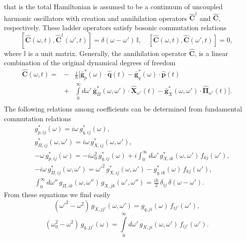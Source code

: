 \documentclass[preprint,showpacs,showkeys,groupedaddress,superscriptaddress]{revtex4}
\begin{document}
that is the total Hamiltonian is assumed to be a continuum of uncoupled harmonic oscillators with creation and annihilation operators $\hat{\mathbf{C}}^{\dag}$ and $\hat{\mathbf{C}}$, respectively. These ladder operators satisfy bosonic commutation relations
\begin{equation}\label{66}
\left[ \mathbf{\hat C}(\omega ,t),\mathbf{\hat C}^\dag (\omega',t) \right] = \delta (\omega-\omega')\,\mathbb{I},\,\,\,\,\,\,\left[ \mathbf{\hat C}(\omega ,t),\mathbf{\hat C}(\omega ',t)\right] = 0,
\end{equation}
where $\mathbb{I}$ is a unit matrix. Generally, the annihilation operator $\hat{\mathbf{C}}$, is a linear combination of the original dynamical degrees of freedom
\begin{eqnarray}
\hat{\mathbf{C}} (\omega,t) = &-& \frac{i}{\hbar }\bigg[\bar{\mathbf{g}}^{*}_p (\omega )\cdot\hat{\mathbf{q}}(t) -
\bar{\mathbf{g}}^{*}_q (\omega )\cdot\hat{\mathbf{p}}(t)\nonumber \\
&+& \int\limits_0^\infty d\omega'\,\bar{\mathbf{g}}^{*}_{\Pi} (\omega ,\omega')\cdot\hat{\mathbf{X}}_{\omega'} (t)-
\bar{\mathbf{g}}^{*}_X (\omega,\omega')\cdot\hat{\mathbf{\Pi}}_{\omega'} (t)\bigg]. \nonumber\\
\end{eqnarray}
The following relations among coefficients can be determined from fundamental commutation relations
\begin{eqnarray}
&& g^*_{p,ij} (\omega)=i \omega\,g^*_{q,ij} (\omega),\\
&& g^*_{\Pi,ij} (\omega,\omega')=i \omega\,g^*_{X,ij} (\omega,\omega'),\\
&& -\omega\, g^*_{p,ij} (\omega)=-i \omega_0^2\,g^*_{q,ij} (\omega)+i\int_0^\infty d\omega'\,g^*_{X,ik} (\omega,\omega')\,f_{kj} (\omega'),\\
&& -i\omega\, g^*_{\Pi,ij} (\omega,\omega')={\omega'}^2\,g^*_{X,ij} (\omega,\omega')-g^*_{q,ik} (\omega)\,f_{kj} (\omega'),\\
&& \int_0^\infty d \omega''\,g_{\Pi,ik} (\omega,\omega'')\,g_{X,jk} (\omega',\omega'')=\frac{i\hbar}{2}\,\delta_{ij}\,\delta(\omega-\omega').
\end{eqnarray}
From these equations we find easily
\begin{equation}\label{gg1}
({\omega'}^2  - \omega ^2 )\,g_{X,jj'} (\omega,\omega') =g_{q,ji} (\omega )\,f_{ij'} (\omega '),
\end{equation}
\begin{equation}\label{gg2}
(\omega_0^2  - \omega ^2 )\,g_{q,jj'} (\omega ) = \int\limits_0^\infty  d\omega'\, g_{X,ji} (\omega,\omega')\,f_{ij'} (\omega').
\end{equation}
\end{document}
